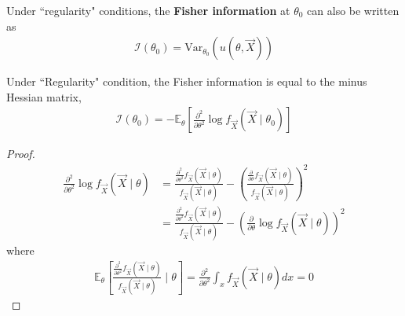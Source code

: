 \documentclass[11pt]{elegantbook}
\begin{document}
\begin{lemma}
    Under ``regularity" conditions, the \textbf{Fisher information} at $\theta_0$ can also be written as
    \begin{equation}
        \begin{aligned}
            \mathcal{I}(\theta_0)=\text{Var}_{\theta_0}(u(\theta,\vec{X}))
        \end{aligned}
        \nonumber
    \end{equation}
\end{lemma}

\begin{lemma}
    Under ``Regularity" condition, the Fisher information is equal to the minus Hessian matrix,
    \begin{equation}
        \begin{aligned}
            \mathcal{I}(\theta_0)
            =-\mathbb{E}_\theta\left[\frac{\partial^2}{\partial \theta^2}\log f_{\vec{X}}(\vec{X}\mid\theta_0)\right]
        \end{aligned}
        \nonumber
    \end{equation}
\end{lemma}
\begin{proof}
    \begin{equation}
        \begin{aligned}
            \frac{\partial^2}{\partial \theta^2}\log f_{\vec{X}}(\vec{X}\mid\theta)&=\frac{\frac{\partial^2}{\partial \theta^2} f_{\vec{X}}(\vec{X}\mid\theta)}{f_{\vec{X}}(\vec{X}\mid\theta)}-\left(\frac{\frac{\partial}{\partial \theta} f_{\vec{X}}(\vec{X}\mid\theta)}{f_{\vec{X}}(\vec{X}\mid\theta)}\right)^2\\
            &=\frac{\frac{\partial^2}{\partial \theta^2} f_{\vec{X}}(\vec{X}\mid\theta)}{f_{\vec{X}}(\vec{X}\mid\theta)}-\left(\frac{\partial}{\partial \theta}\log f_{\vec{X}}(\vec{X}\mid\theta)\right)^2
        \end{aligned}
        \nonumber
    \end{equation}
    where
    \begin{equation}
        \begin{aligned}
            \mathbb{E}_\theta\left[\frac{\frac{\partial^2}{\partial \theta^2} f_{\vec{X}}(\vec{X}\mid\theta)}{f_{\vec{X}}(\vec{X}\mid\theta)}\mid\theta\right]=\frac{\partial^2}{\partial \theta^2}\int_x f_{\vec{X}}(\vec{X}\mid\theta) dx=0
        \end{aligned}
        \nonumber
    \end{equation}
\end{proof}
\end{document}
